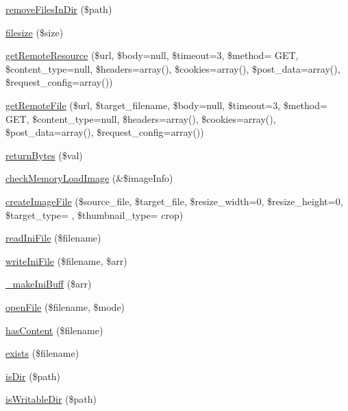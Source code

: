 \begin{DoxyCompactItemize}
\item 
\hyperlink{classFileHandler_a07839b4971e9ef40039d23ea65977d69}{remove\+Files\+In\+Dir} (\$path)
\item 
\hyperlink{classFileHandler_ae235b4ded589fb13caed260fabc0a30c}{filesize} (\$size)
\item 
\hyperlink{classFileHandler_a602c039b415c15d9d6866e586282faf7}{get\+Remote\+Resource} (\$url, \$body=null, \$timeout=3, \$method= \textquotesingle{}G\+E\+T\textquotesingle{}, \$content\+\_\+type=null, \$headers=array(), \$cookies=array(), \$post\+\_\+data=array(), \$request\+\_\+config=array())
\item 
\hyperlink{classFileHandler_a0e3720cacd0137d537834376ce7b982b}{get\+Remote\+File} (\$url, \$target\+\_\+filename, \$body=null, \$timeout=3, \$method= \textquotesingle{}G\+E\+T\textquotesingle{}, \$content\+\_\+type=null, \$headers=array(), \$cookies=array(), \$post\+\_\+data=array(), \$request\+\_\+config=array())
\item 
\hyperlink{classFileHandler_a79dd068137470965b560f4d23d978e7d}{return\+Bytes} (\$val)
\item 
\hyperlink{classFileHandler_a0b240e89b6ce57cb94e855fc25e5e9f3}{check\+Memory\+Load\+Image} (\&\$image\+Info)
\item 
\hyperlink{classFileHandler_a171948d79c14415ad45b7581a011c593}{create\+Image\+File} (\$source\+\_\+file, \$target\+\_\+file, \$resize\+\_\+width=0, \$resize\+\_\+height=0, \$target\+\_\+type= \textquotesingle{}\textquotesingle{}, \$thumbnail\+\_\+type= \textquotesingle{}crop\textquotesingle{})
\item 
\hyperlink{classFileHandler_a58a8bbae1ab4acb358599db38a47db4d}{read\+Ini\+File} (\$filename)
\item 
\hyperlink{classFileHandler_aa0fd9ce8f2c81bee472a403e75b578bd}{write\+Ini\+File} (\$filename, \$arr)
\item 
\hyperlink{classFileHandler_a8975f9247987757497e0288f3ee09173}{\+\_\+make\+Ini\+Buff} (\$arr)
\item 
\hyperlink{classFileHandler_a690753d8cf8ff837f28a811cdfbfa069}{open\+File} (\$filename, \$mode)
\item 
\hyperlink{classFileHandler_ad872016e83b1f62a03d54e359ce31f73}{has\+Content} (\$filename)
\item 
\hyperlink{classFileHandler_a862c4f6349792ae8f094ec456c9a26ed}{exists} (\$filename)
\item 
\hyperlink{classFileHandler_a5fd371542d6f1a86269d0b8795e74471}{is\+Dir} (\$path)
\item 
\hyperlink{classFileHandler_a9494e34a28f27b6a1ab2e032aada2bbb}{is\+Writable\+Dir} (\$path)
\end{DoxyCompactItemize}


